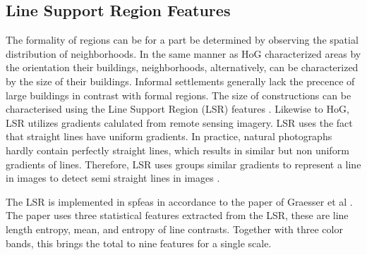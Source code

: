\subsection{Line Support Region Features}

The formality of regions can be for a part be determined by observing the
spatial distribution of neighborhoods. In the same manner as HoG characterized
areas by the orientation their buildings, neighborhoods, alternatively, can be
characterized by the size of their buildings. Informal settlements generally
lack the precence of large buildings in contrast with formal regions. The size
of constructions can be characterised using the Line Support Region (LSR)
features \cite{unsalan2004classifying}. Likewise to HoG, LSR utilizes gradients
calulated from remote sensing imagery. LSR uses the fact that straight lines
have uniform gradients. In practice, natural photographs hardly contain
perfectly straight lines, which results in similar but non uniform gradients of
lines. Therefore, LSR uses groups similar gradients to represent a line in
images to detect semi straight lines in images \cite{burns1986extracting}.

The LSR is implemented in spfeas in accordance to the paper of Graesser et al
\cite{graesser2012image}. The paper uses three statistical features extracted
from the LSR, these are line length entropy, mean, and entropy of line
contrasts. Together with three color bands, this brings the total to nine
features for a single scale.
